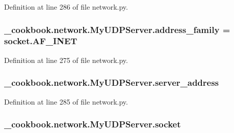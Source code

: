 Definition at line 286 of file network.\-py.

\hypertarget{class__cookbook_1_1network_1_1MyUDPServer_a4b7d2c6b542b30c47bf020647b8685f9}{
\subsubsection[{address\-\_\-family}]{\setlength{\rightskip}{0pt plus 5cm}\-\_\-cookbook.\-network.\-My\-U\-D\-P\-Server.\-address\-\_\-family = socket.\-A\-F\-\_\-\-I\-N\-E\-T\hspace{0.3cm}{\ttfamily [static]}}}\label{class__cookbook_1_1network_1_1MyUDPServer_a4b7d2c6b542b30c47bf020647b8685f9}


Definition at line 275 of file network.\-py.

\hypertarget{class__cookbook_1_1network_1_1MyUDPServer_aed17e4556fb33e07bc8a348aedf63ae4}{
\subsubsection[{server\-\_\-address}]{\setlength{\rightskip}{0pt plus 5cm}\-\_\-cookbook.\-network.\-My\-U\-D\-P\-Server.\-server\-\_\-address}}\label{class__cookbook_1_1network_1_1MyUDPServer_aed17e4556fb33e07bc8a348aedf63ae4}


Definition at line 285 of file network.\-py.

\hypertarget{class__cookbook_1_1network_1_1MyUDPServer_aeae33e7df31d329cd74f78f195b5753b}{
\subsubsection[{socket}]{\setlength{\rightskip}{0pt plus 5cm}\-\_\-cookbook.\-network.\-My\-U\-D\-P\-Server.\-socket}}\label{class__cookbook_1_1network_1_1MyUDPServer_aeae33e7df31d329cd74f78f195b5753b}


